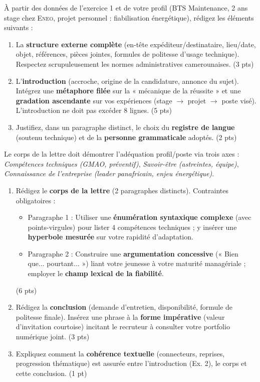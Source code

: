 \documentclass[11pt]{article}
\begin{document}
\begin{exercice}
À partir des données de l'exercice 1 et de votre profil (BTS Maintenance, 2 ans stage chez \textsc{Eneo}, projet personnel : fiabilisation énergétique), rédigez les éléments suivants :
\begin{enumerate}
    \item La \textbf{structure externe complète} (en-tête expéditeur/destinataire, lieu/date, objet, références, pièces jointes, formules de politesse d'usage technique). Respectez scrupuleusement les normes administratives camerounaises. (3 pts)
    \item L'\textbf{introduction} (accroche, origine de la candidature, annonce du sujet). Intégrez une \textbf{métaphore filée} sur la « mécanique de la réussite » et une \textbf{gradation ascendante} sur vos expériences (stage $\rightarrow$ projet $\rightarrow$ poste visé). L'introduction ne doit pas excéder 8 lignes. (5 pts)
    \item Justifiez, dans un paragraphe distinct, le choix du \textbf{registre de langue} (soutenu technique) et de la \textbf{personne grammaticale} adoptés. (2 pts)
\end{enumerate}
\end{exercice}

\begin{exercice}
Le corps de la lettre doit démontrer l'adéquation profil/poste via trois axes : \textit{Compétences techniques (GMAO, préventif)}, \textit{Savoir-être (astreintes, équipe)}, \textit{Connaissance de l'entreprise (leader panafricain, enjeu énergétique)}.
\begin{enumerate}
    \item Rédigez le \textbf{corps de la lettre} (2 paragraphes distincts). Contraintes obligatoires :
    \begin{itemize}
        \item Paragraphe 1 : Utiliser une \textbf{énumération syntaxique complexe} (avec points-virgules) pour lister 4 compétences techniques ; y insérer une \textbf{hyperbole mesurée} sur votre rapidité d'adaptation.
        \item Paragraphe 2 : Construire une \textbf{argumentation concessive} (« Bien que... pourtant... ») liant votre jeunesse à votre maturité managériale ; employer le \textbf{champ lexical de la fiabilité}.
    \end{itemize}
    (6 pts)
    \item Rédigez la \textbf{conclusion} (demande d'entretien, disponibilité, formule de politesse finale). Insérez une phrase à la \textbf{forme impérative} (valeur d'invitation courtoise) incitant le recruteur à consulter votre portfolio numérique joint. (3 pts)
    \item Expliquez comment la \textbf{cohérence textuelle} (connecteurs, reprises, progression thématique) est assurée entre l'introduction (Ex. 2), le corps et cette conclusion. (1 pt)
\end{enumerate}
\end{exercice}
\end{document}
